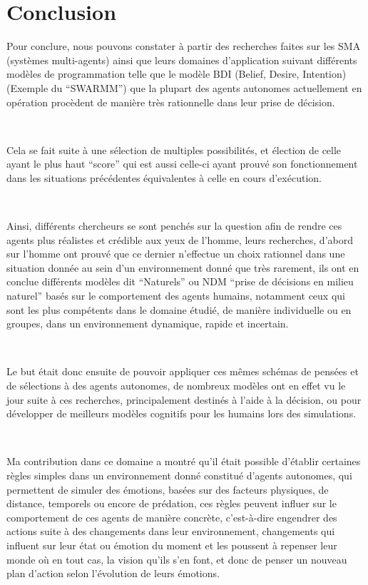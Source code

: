 \chapter{Conclusion} %

\label{Chapter7} %

Pour conclure, nous pouvons constater à partir des recherches faites sur les SMA (systèmes multi-agents) ainsi que leurs domaines d’application suivant  différents modèles de programmation telle que le modèle BDI (Belief, Desire, Intention) (Exemple du “SWARMM”) que la plupart des agents autonomes  actuellement en opération procèdent de manière très rationnelle dans leur prise de décision.

~\par
Cela se fait suite à une sélection de multiples possibilités, et élection de celle ayant le plus haut “score” qui est aussi celle-ci ayant prouvé son fonctionnement dans les situations précédentes équivalentes à celle en cours d'exécution.

~\par
Ainsi, différents chercheurs se sont penchés sur la question afin de rendre ces agents plus réalistes et crédible aux yeux de l’homme, leurs recherches, d’abord sur l’homme ont prouvé que ce dernier n'effectue un choix rationnel dans une situation donnée au sein d’un environnement donné que très rarement, ils ont en conclue différents modèles dit “Naturels” ou NDM “prise de décisions en milieu naturel” basés sur le comportement des agents humains, notamment ceux qui sont les plus compétents dans le domaine étudié, de manière individuelle ou en groupes, dans un environnement dynamique, rapide et incertain.

~\par
Le but était donc ensuite de pouvoir appliquer ces mêmes schémas de pensées et de sélections à des agents autonomes, de nombreux modèles ont en effet vu le jour suite à ces recherches, principalement destinés à l’aide à la décision, ou pour développer de meilleurs modèles cognitifs pour les humains lors des simulations.

~\par
Ma contribution dans ce domaine a montré qu’il était possible d’établir certaines règles simples dans un environnement donné constitué d’agents autonomes, qui permettent de simuler des émotions, basées sur des facteurs physiques, de distance, temporels ou encore de prédation, ces règles peuvent influer sur le comportement de ces agents de manière concrète, c’est-à-dire engendrer des actions suite à des changements dans leur environnement, changements qui influent sur leur état ou émotion du moment et les poussent à repenser leur monde où en tout cas, la vision qu’ils s’en font, et donc de penser un nouveau plan d’action selon l’évolution de leurs émotions.

